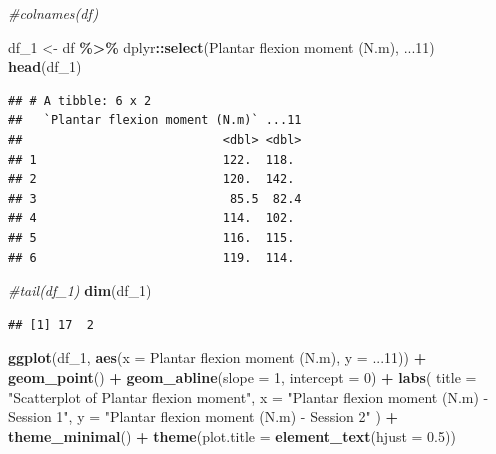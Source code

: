 \documentclass[
]{article}
\newenvironment{Shaded}{\begin{snugshade}}{\end{snugshade}}
\newcommand{\AttributeTok}[1]{\textcolor[rgb]{0.13,0.29,0.53}{#1}}
\newcommand{\CommentTok}[1]{\textcolor[rgb]{0.56,0.35,0.01}{\textit{#1}}}
\newcommand{\DecValTok}[1]{\textcolor[rgb]{0.00,0.00,0.81}{#1}}
\newcommand{\FloatTok}[1]{\textcolor[rgb]{0.00,0.00,0.81}{#1}}
\newcommand{\FunctionTok}[1]{\textcolor[rgb]{0.13,0.29,0.53}{\textbf{#1}}}
\newcommand{\NormalTok}[1]{#1}
\newcommand{\OtherTok}[1]{\textcolor[rgb]{0.56,0.35,0.01}{#1}}
\newcommand{\SpecialCharTok}[1]{\textcolor[rgb]{0.81,0.36,0.00}{\textbf{#1}}}
\newcommand{\StringTok}[1]{\textcolor[rgb]{0.31,0.60,0.02}{#1}}
\begin{document}
\begin{Shaded}
\begin{Highlighting}[]
\CommentTok{\#colnames(df)}

\NormalTok{df\_1 }\OtherTok{\textless{}{-}}\NormalTok{ df }\SpecialCharTok{\%\textgreater{}\%}\NormalTok{ dplyr}\SpecialCharTok{::}\FunctionTok{select}\NormalTok{(}\StringTok{\textasciigrave{}}\AttributeTok{Plantar flexion moment (N.m)}\StringTok{\textasciigrave{}}\NormalTok{, }\StringTok{\textasciigrave{}}\AttributeTok{...11}\StringTok{\textasciigrave{}}\NormalTok{)}
\FunctionTok{head}\NormalTok{(df\_1)}
\end{Highlighting}
\end{Shaded}

\begin{verbatim}
## # A tibble: 6 x 2
##   `Plantar flexion moment (N.m)` ...11
##                            <dbl> <dbl>
## 1                          122.  118. 
## 2                          120.  142. 
## 3                           85.5  82.4
## 4                          114.  102. 
## 5                          116.  115. 
## 6                          119.  114.
\end{verbatim}

\begin{Shaded}
\begin{Highlighting}[]
\CommentTok{\#tail(df\_1)}
\FunctionTok{dim}\NormalTok{(df\_1)}
\end{Highlighting}
\end{Shaded}

\begin{verbatim}
## [1] 17  2
\end{verbatim}

\begin{Shaded}
\begin{Highlighting}[]
\FunctionTok{ggplot}\NormalTok{(df\_1, }\FunctionTok{aes}\NormalTok{(}\AttributeTok{x =} \StringTok{\textasciigrave{}}\AttributeTok{Plantar flexion moment (N.m)}\StringTok{\textasciigrave{}}\NormalTok{, }\AttributeTok{y =} \StringTok{\textasciigrave{}}\AttributeTok{...11}\StringTok{\textasciigrave{}}\NormalTok{)) }\SpecialCharTok{+}
  \FunctionTok{geom\_point}\NormalTok{() }\SpecialCharTok{+}
  \FunctionTok{geom\_abline}\NormalTok{(}\AttributeTok{slope =} \DecValTok{1}\NormalTok{, }\AttributeTok{intercept =} \DecValTok{0}\NormalTok{) }\SpecialCharTok{+}
  \FunctionTok{labs}\NormalTok{(}
    \AttributeTok{title =} \StringTok{"Scatterplot of Plantar flexion moment"}\NormalTok{,}
    \AttributeTok{x =} \StringTok{"Plantar flexion moment (N.m) {-} Session 1"}\NormalTok{,}
    \AttributeTok{y =} \StringTok{"Plantar flexion moment (N.m) {-} Session 2"}
\NormalTok{  ) }\SpecialCharTok{+}
  \FunctionTok{theme\_minimal}\NormalTok{() }\SpecialCharTok{+} 
  \FunctionTok{theme}\NormalTok{(}\AttributeTok{plot.title =} \FunctionTok{element\_text}\NormalTok{(}\AttributeTok{hjust =} \FloatTok{0.5}\NormalTok{))}
\end{Highlighting}
\end{Shaded}
\end{document}

